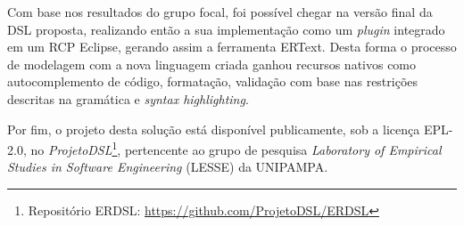 Com base nos resultados do grupo focal, foi possível chegar na versão final da \ac{DSL} proposta, realizando então a sua implementação como um \textit{plugin} integrado em um \ac{RCP} Eclipse, gerando assim a ferramenta ERText.
Desta forma o processo de modelagem com a nova linguagem criada ganhou recursos nativos como autocomplemento de código, formatação, validação com base nas restrições descritas na gramática e \textit{syntax highlighting}.

Por fim, o projeto desta solução está disponível publicamente, sob a licença EPL-2.0, no \textit{ProjetoDSL}\footnote{Repositório ERDSL: \url{https://github.com/ProjetoDSL/ERDSL}}, pertencente ao grupo de pesquisa \textit{Laboratory of Empirical Studies in Software Engineering} (LESSE) da UNIPAMPA.


